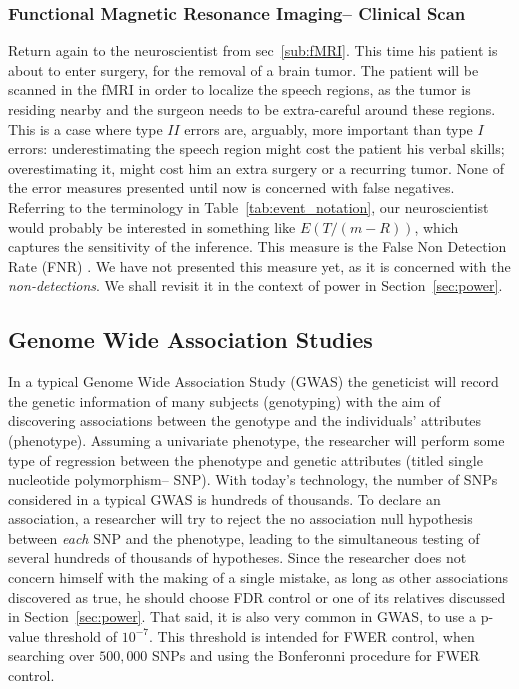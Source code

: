 \documentclass[review,12pt]{article}
\theoremstyle{definition}
\theoremstyle{definition}
\begin{document}
\subsubsection{Functional Magnetic Resonance Imaging-- Clinical Scan}
Return again to the neuroscientist from sec~\ref{sub:fMRI}. This time his patient is about to enter surgery, for the removal of a brain tumor. The patient will be scanned in the fMRI in order to localize the speech regions, as the tumor is residing nearby and the surgeon needs to be extra-careful around these regions. This is a case where type $II$ errors are, arguably, more important than type $I$ errors: underestimating the speech region might cost the patient his verbal skills; overestimating it, might cost him an extra surgery or a recurring tumor. None of the error measures presented until now is concerned with false negatives. Referring to the terminology in Table~\ref{tab:event_notation}, our neuroscientist would probably be interested in something like $E(T/(m-R))$, which captures the sensitivity of the inference. This measure is the False Non Detection Rate (FNR) \citep{genovese_operating_2002}. We have not presented this measure yet, as it is concerned with the \emph{non-detections}. We shall revisit it in the context of power in Section~\ref{sec:power}. 




\subsection{\label{sec:GWAS}Genome Wide Association Studies}
In a typical Genome Wide Association Study (GWAS) the geneticist will record the genetic information of many subjects (genotyping) with the aim of discovering associations between the genotype and the individuals' attributes (phenotype). Assuming a univariate phenotype, the researcher will perform some type of regression between the phenotype and genetic attributes (titled single nucleotide polymorphism-- SNP). With today's technology, the number of SNPs considered in a typical GWAS is hundreds of thousands. To declare an association, a researcher will try to reject the no association null hypothesis between \emph{each} SNP and the phenotype, leading to the simultaneous testing of several hundreds of thousands of hypotheses. 
Since the researcher does not concern himself with the making of a single mistake, as long as other associations discovered as true, he should choose FDR control or one of its relatives discussed in Section~\ref{sec:power}. 
That said, it is also very common in GWAS, to use a p-value threshold of $10^{-7}$. This threshold is intended for FWER control, when searching over $500,000$ SNPs and using the Bonferonni procedure \cite{bush_chapter_2012} for FWER control. 
\end{document}
